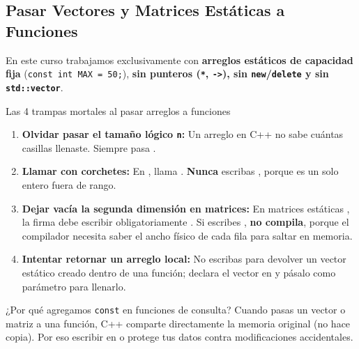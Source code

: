 \documentclass[11pt,letterpaper]{article}
\begin{document}
\subsection{Pasar Vectores y Matrices Estáticas a Funciones}

En este curso trabajamos exclusivamente con \textbf{arreglos estáticos de capacidad fija} (\texttt{const int MAX = 50;}), \textbf{sin punteros (\texttt{*}, \texttt{->}), sin \texttt{new}/\texttt{delete} y sin \texttt{std::vector}}.

\begin{peligro}{Las 4 trampas mortales al pasar arreglos a funciones}
\begin{enumerate}
  \item \textbf{Olvidar pasar el tamaño lógico \texttt{n}:} Un arreglo en C++ no sabe cuántas casillas llenaste. Siempre pasa .
  \item \textbf{Llamar con corchetes:} En , llama . \textbf{Nunca} escribas , porque  es un solo entero fuera de rango.
  \item \textbf{Dejar vacía la segunda dimensión en matrices:} En matrices estáticas , la firma debe escribir obligatoriamente . Si escribes , \textbf{no compila}, porque el compilador necesita saber el ancho físico de cada fila para saltar en memoria.
  \item \textbf{Intentar retornar un arreglo local:} No escribas  para devolver un vector estático creado dentro de una función; declara el vector en  y pásalo como parámetro para llenarlo.
\end{enumerate}
\end{peligro}

\begin{consejo}{¿Por qué agregamos \texttt{const} en funciones de consulta?}
Cuando pasas un vector o matriz a una función, C++ comparte directamente la memoria original (no hace copia). Por eso escribir  en  o  protege tus datos contra modificaciones accidentales.
\end{consejo}


\end{document}
